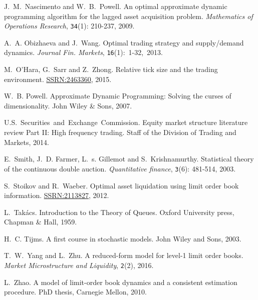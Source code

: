 \documentclass{amsart}[11pt]
\numberwithin{equation}{section}
\theoremstyle{definition}
\begin{document}
\begin{thebibliography}{10}
J.~M.~Nascimento and W.~B.~Powell.
An optimal approximate dynamic programming algorithm for the lagged asset acquisition problem.
\textit{Mathematics of Operations Research}, {\tt 34}(1): 210-237, 2009.

A.~A. Obizhaeva and J.~Wang.
Optimal trading strategy and supply/demand dynamics.
\textit{Journal Fin. Markets}, {\tt 16}(1):~1-32,~2013.

M.~O'Hara, G.~Sarr and Z.~Zhong.
Relative tick size and the trading environment.
\href{https://papers.ssrn.com/sol3/papers.cfm?abstract_id=2463360}{SSRN:2463360}, 
2015.

W.~B. Powell.
Approximate Dynamic Programming: Solving the curses of dimensionality.
John Wiley \& Sons, 2007.

U.S.~Securities~and~Exchange~Commission. 
Equity market structure literature review Part II: High frequency trading. 
Staff of the Division of Trading and Markets, 2014.

E.~Smith, J.~D. Farmer, L.~s. Gillemot and S.~Krishnamurthy.
Statistical theory of the continuous double auction.
\textit{Quantitative finance}, {\tt 3}(6): 481-514, 2003.

S.~Stoikov and R.~Waeber.
Optimal asset liquidation using limit order book information.
\href{https://papers.ssrn.com/sol3/papers.cfm?abstract_id=2113827}{SSRN:2113827}, 
2012.

L.~Tak{\'a}cs.
Introduction to the Theory of Queues.
Oxford University press, Chapman \& Hall, 1959.

H.~C. Tijms.
A first course in stochastic models.
John Wiley and Sons, 2003.

T.~W.~Yang and L.~Zhu.
A reduced-form model for level-1 limit order books.
\textit{Market Microstructure and Liquidity}, {\tt 2}(2), 2016.

L.~Zhao.
A model of limit-order book dynamics and a consistent estimation procedure.
PhD thesis, Carnegie Mellon, 2010.


\end{thebibliography}
\end{document}
